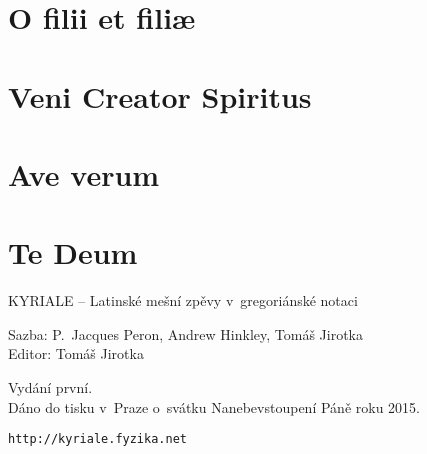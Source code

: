 \documentclass[12pt]{article} %
\begin{document}
\section{O filii et fili\ae}
\vspace{0.5em}



\section{Veni Creator Spiritus}
\vspace{0.5em}



\section{Ave verum}


\section{Te Deum}
\vspace{1em}





\newpage
\tableofcontents





\newpage
\thispagestyle{empty}
\mbox{}

\begin{centering}
\setlength{\parskip}{1em}
\vspace{16cm}

	KYRIALE -- Latinské mešní zpěvy v~gregoriánské notaci

	Sazba: P.~Jacques Peron, Andrew Hinkley, Tomáš Jirotka\\
	Editor: Tomáš Jirotka

	Vydání první.\\
	Dáno do tisku v~Praze o~svátku Nanebevstoupení Páně roku 2015.

	{\tt http://kyriale.fyzika.net}

\end{centering}
\end{document}
